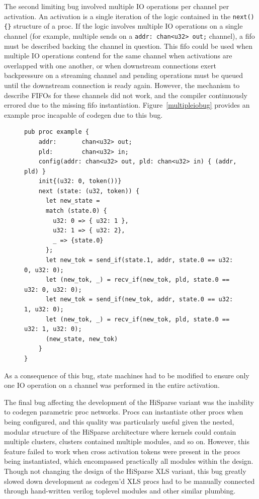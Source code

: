 The second limiting bug involved multiple IO operations per channel per activation. An activation is a single iteration of the logic contained in the \lstinline[style=mystyle]|next(){}| structure of a proc. If the logic involves multiple IO operations on a single channel (for example, multiple sends on a \lstinline[style=mystyle]|addr: chan<u32> out;| channel), a fifo must be described backing the channel in question. This fifo could be used when multiple IO operations contend for the same channel when activations are overlapped with one another, or when downstream connections exert backpressure on a streaming channel and pending operations must be queued until the downstream connection is ready again. However, the mechanism to describe FIFOs for these channels did not work, and the compiler continuously errored due to the missing fifo instantiation. Figure~\ref{multipleiobug} provides an example proc incapable of codegen due to this bug.

\begin{figure}[ht]
\begin{lstlisting}[label={multipleiobug},caption={Example proc that failed to codegen due to multiple operations per channel per activation. Note this proc is free of the previous tokens flowing through match arms bug.}, captionpos=b,style=mystyle]
pub proc example {
    addr:       chan<u32> out;
    pld:        chan<u32> in;
    config(addr: chan<u32> out, pld: chan<u32> in) { (addr, pld) }
    init{(u32: 0, token())}
    next (state: (u32, token)) {
      let new_state = 
      match (state.0) {
        u32: 0 => { u32: 1 },
        u32: 1 => { u32: 2},
        _ => {state.0}
      };
      let new_tok = send_if(state.1, addr, state.0 == u32: 0, u32: 0);
      let (new_tok, _) = recv_if(new_tok, pld, state.0 == u32: 0, u32: 0);
      let new_tok = send_if(new_tok, addr, state.0 == u32: 1, u32: 0);
      let (new_tok, _) = recv_if(new_tok, pld, state.0 == u32: 1, u32: 0);
      (new_state, new_tok)
    }
}
\end{lstlisting}
\end{figure}

As a consequence of this bug, state machines had to be modified to ensure only one IO operation on a channel was performed in the entire activation.

The final bug affecting the development of the HiSparse variant was the inability to codegen parametric proc networks. Procs can instantiate other procs when being configured, and this quality was particularly useful given the nested, modular structure of the HiSparse architecture where kernels could contain multiple clusters, clusters contained multiple modules, and so on. However, this feature failed to work when cross activation tokens were present in the procs being instantiated, which encompassed practically all modules within the design. Though not changing the design of the HiSparse XLS variant, this bug greatly slowed down development as codegen'd XLS procs had to be manually connected through hand-written verilog toplevel modules and other similar plumbing.

